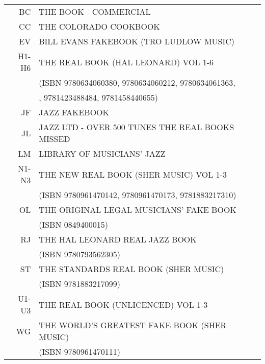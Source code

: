 \documentclass[8pt]{scrartcl}
\begin{document}
\selectfont
\begin{center}
  \begin{tabular}{rl}%
    BC    &  THE BOOK - COMMERCIAL\\
    CC    &  THE COLORADO COOKBOOK\\
    EV    &  BILL EVANS FAKEBOOK (TRO LUDLOW MUSIC)\\
    H1-H6 &  THE REAL BOOK (HAL LEONARD) VOL 1-6\\
          &  \quad(ISBN 9780634060380, 9780634060212, 9780634061363, \\
          &  \quad9781423425427, 9781423488484, 9781458440655) \\
    JF    &  JAZZ FAKEBOOK\\
    JL    &  JAZZ LTD - OVER 500 TUNES THE REAL BOOKS MISSED\\
    LM    &  LIBRARY OF MUSICIANS’ JAZZ\\
    N1-N3 &  THE NEW REAL BOOK (SHER MUSIC) VOL 1-3\\
          &  \quad(ISBN 9780961470142, 9780961470173, 9781883217310)\\
    OL    & THE ORIGINAL LEGAL MUSICIANS' FAKE BOOK \\
          &  \quad(ISBN 0849400015)\\
    RJ    &  THE HAL LEONARD REAL JAZZ BOOK\\
          &  \quad(ISBN 9780793562305)\\
    ST    &  THE STANDARDS REAL BOOK (SHER MUSIC)\\
          &  \quad(ISBN 9781883217099)\\
    U1-U3 &  THE REAL BOOK (UNLICENCED) VOL 1-3\\
    WG    &  THE WORLD'S GREATEST FAKE BOOK (SHER MUSIC)\\
          &  \quad(ISBN 9780961470111)\\
  \end{tabular}
\end{center}

\begin{multicols}{3}
  \raggedright
  
\end{multicols}
\end{document}

